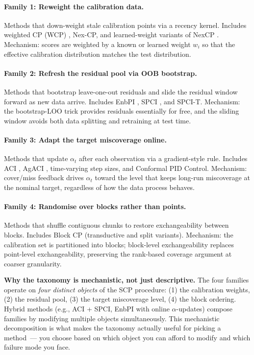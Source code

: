 \documentclass[letterpaper,11pt,leqno]{article}
\begin{document}
\paragraph{Family 1: Reweight the calibration data.} Methods that down-weight stale calibration points via a recency kernel. Includes weighted CP (WCP) \cite{tibshirani2019weighted}, Nex-CP, and learned-weight variants of NexCP \cite{barber2023beyond}. Mechanism: scores are weighted by a known or learned weight $w_i$ so that the effective calibration distribution matches the test distribution.

\paragraph{Family 2: Refresh the residual pool via OOB bootstrap.} Methods that bootstrap leave-one-out residuals and slide the residual window forward as new data arrive. Includes EnbPI \cite{xu2023enbpi}, SPCI \cite{xu2022spci}, and SPCI-T. Mechanism: the bootstrap-LOO trick provides residuals essentially for free, and the sliding window avoids both data splitting and retraining at test time.

\paragraph{Family 3: Adapt the target miscoverage online.} Methods that update $\alpha_t$ after each observation via a gradient-style rule. Includes ACI \cite{gibbs2021aci}, AgACI \cite{zaffran2022aci}, time-varying step sizes, and Conformal PID Control. Mechanism: cover/miss feedback drives $\alpha_t$ toward the level that keeps long-run miscoverage at the nominal target, regardless of how the data process behaves.

\paragraph{Family 4: Randomise over blocks rather than points.} Methods that shuffle contiguous chunks to restore exchangeability between blocks. Includes Block CP (transductive and split variants). Mechanism: the calibration set is partitioned into blocks; block-level exchangeability replaces point-level exchangeability, preserving the rank-based coverage argument at coarser granularity.

\begin{keyinsight}
\textbf{Why the taxonomy is mechanistic, not just descriptive.} The four families operate on \emph{four distinct objects} of the SCP procedure: (1) the calibration weights, (2) the residual pool, (3) the target miscoverage level, (4) the block ordering. Hybrid methods (e.g., ACI + SPCI, EnbPI with online $\alpha$-updates) compose families by modifying multiple objects simultaneously. This mechanistic decomposition is what makes the taxonomy actually useful for picking a method~--- you choose based on which object you can afford to modify and which failure mode you face.
\end{keyinsight}
\end{document}

